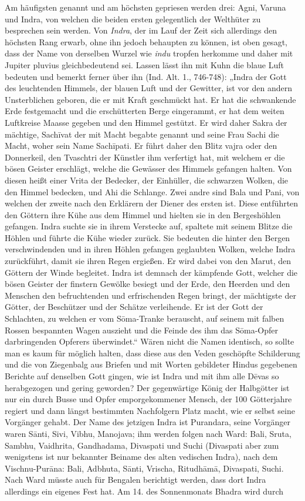 \documentclass{article}
\begin{document}
Am häufigsten genannt und am höchsten gepriesen werden drei: Agni, Varuna und Indra, von welchen die beiden ersten gelegentlich der Welthüter zu besprechen sein werden. Von \emph{Indra}, der im Lauf der Zeit sich allerdings den höchsten Rang erwarb, ohne ihn jedoch behaupten zu können, ist oben gesagt, dass der Name von derselben Wurzel wie \emph{indu} tropfen herkomme und daher mit Jupiter pluvius gleichbedeutend sei. Lassen lässt ihn mit Kuhn die blaue Luft bedeuten und bemerkt ferner über ihn (Ind. Alt. 1., 746-748): „Indra der Gott des leuchtenden Himmels, der blauen Luft und der Gewitter, ist vor den andern Unsterblichen geboren, die er mit Kraft geschmückt hat. Er hat die schwankende Erde festgemacht und die erschütterten Berge eingerammt, er hat dem weiten Luftkreise Maasse gegeben und den Himmel gestützt. Er wird daher Sakra der mächtige, Sach\={i}vat der mit Macht begabte genannt und seine Frau Sachi die Macht, woher sein Name Sach\={i}pati. Er führt daher den Blitz vajra oder den Donnerkeil, den Tvaschtri der Künstler ihm verfertigt hat, mit welchem er die bösen Geister erschlägt, welche die Gewässer des Himmels gefangen halten. Von diesen heißt einer Vrita der Bedecker, der Einhüller, die schwarzen Wolken, die den Himmel bedecken, und Ahi die Schlange. Zwei andre sind Bala und Pani, von welchen der zweite nach den Erklärern der Diener des ersten ist. Diese entführten den Göttern ihre Kühe aus dem Himmel und hielten sie in den Bergeshöhlen gefangen. Indra suchte sie in ihrem Verstecke auf, spaltete mit seinem Blitze die Höhlen und führte die Kühe wieder zurück. Sie bedeuten die hinter den Bergen verschwindenden und in ihren Höhlen gefangen geglaubten Wolken, welche Indra zurückführt, damit sie ihren Regen ergießen. Er wird dabei von den Marut, den Göttern der Winde begleitet. Indra ist demnach der kämpfende Gott, welcher die bösen Geister der finstern Gewölke besiegt und der Erde, den Heerden und den Menschen den befruchtenden und erfrischenden Regen bringt, der mächtigste der Götter, der Beschützer und der Schätze verleihende. Er ist der Gott der Schlachten, zu welchen er vom S\={o}ma-Tranke berauscht, auf seinem mit falben Rossen bespannten Wagen auszieht und die Feinde des ihm das S\={o}ma-Opfer darbringenden Opferers überwindet.“ Wären nicht die Namen identisch, so sollte man es kaum für möglich halten, dass diese aus den Veden geschöpfte Schilderung und die von Ziegenbalg aus Briefen und mit Worten gebildeter Hindus gegebenen Berichte auf denselben Gott gingen, wie ist Indra und mit ihm alle D\={e}vas so herabgezogen und gering geworden? Der gegenwärtige König der Halbgötter ist nur ein durch Busse und Opfer emporgekommener Mensch, der 100 Götterjahre regiert und dann längst bestimmten Nachfolgern Platz macht, wie er selbst seine Vorgänger gehabt. Der Name des jetzigen Indra ist Purandara, seine Vorgänger waren S\={a}nti, Sivi, Vibhu, Manojava; ihm werden folgen nach Ward: Bali, Sruta, Sambhu, Vaidhrita, Gandhadama, Divaspati und Suchi (Divaspati aber zum wenigstens ist nur bekannter Beiname des alten vedischen Indra), nach dem Vischnu-Pur\={a}na: Bali, Adbhuta, S\={a}nti, Vrischa, Ritudh\={a}m\={a}, Divaspati, Suchi. Nach Ward müsste auch für Bengalen berichtigt werden, dass dort Indra allerdings ein eigenes Fest hat. Am 14. des Sonnenmonats Bhadra wird durch 
\end{document}
